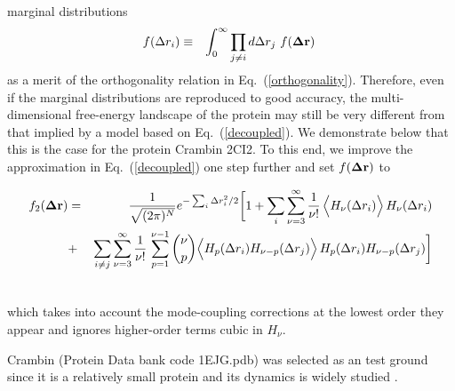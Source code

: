 \documentclass[prl,nofootinbib,twocolumn,floatfix,showpacs]{revtex4}
\begin{document}
marginal distributions
\begin{eqnarray}
\label{marginal}
f(\Delta r_i) &\equiv& \int_0^\infty \prod_{j\ne i}d\Delta r_j\ f({\bf\Delta r})\ 
\end{eqnarray}
as a merit of the orthogonality relation in
Eq.~(\ref{orthogonality}). Therefore, even if the marginal
distributions are reproduced to good accuracy, the multi-dimensional
free-energy landscape of the protein may still be very different from
that implied by a model based on Eq.~(\ref{decoupled}). We demonstrate
below that this is the case for the protein Crambin 2CI2. To this end,
we improve the approximation in Eq.~(\ref{decoupled}) one step
further and set $f({\bf\Delta r})$ to
\begin{widetext}
\begin{eqnarray}
\label{hermite_expansion2}
f_2({\bf\Delta r}) &=& \frac{1}{\sqrt{(2\pi)^N}} e^{ -\sum_i \Delta
  r_i^2/2} \bigg[ 1 + \sum_i\sum_{\nu=3}^\infty
  \frac{1}{\nu!}\, \Big\langle
  H_\nu(\Delta r_i)\Big\rangle\,H_\nu(\Delta r_i) \nonumber \\
&+&  \sum_{i\ne j}\sum_{\nu=3}^\infty
  \frac{1}{\nu!}\,\sum_{p=1}^{\nu-1} {\nu\choose p} \Big\langle
  H_p(\Delta r_i)H_{\nu-p}(\Delta r_j)\Big\rangle\,H_p(\Delta r_i)H_{\nu-p}(\Delta r_j) \bigg] \nonumber \\
&&
\end{eqnarray}
\end{widetext}
which takes into account the mode-coupling corrections at the lowest
order they appear and ignores higher-order terms cubic in $H_\nu$.





Crambin (Protein Data bank code 1EJG.pdb) was selected as an test ground
since it is a relatively small protein and its dynamics is
widely studied \cite{Teeter1990,Levitt1985,Lange2006}.  
\end{document}
